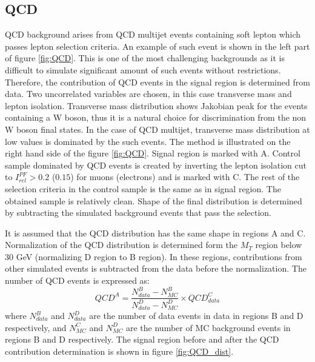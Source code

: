 \subsection{QCD}
\label{sec:QCD}

QCD background arises from QCD multijet events containing soft lepton which passes lepton selection criteria. An example of such event is shown in the left part of figure \ref{fig:QCD}. This is one of the most challenging backgrounds as it is difficult to simulate significant amount of such events without restrictions. Therefore, the contribution of QCD events in the signal region is determined from data. Two uncorrelated variables are chosen, in this case transverse mass and lepton isolation. Transverse mass distribution shows Jakobian peak for the events containing a W boson, thus it is a natural choice for discrimination from the non W boson final states. In the case of QCD multijet, transverse mass distribution at low values is dominated by the such events. The method is illustrated on the right hand side of the figure \ref{fig:QCD}. Signal region is marked with A. Control sample dominated by QCD events is created by inverting the lepton isolation cut to $I_{rel}^{PF}>0.2$ ($0.15$) for muons (electrons) and is marked with C. The rest of the selection criteria in the control sample is the same as in signal region. The obtained sample is relatively clean. Shape of the final distribution is determined by subtracting the simulated background events that pass the selection. 
\par It is assumed that the QCD distribution has the same shape in regions A and C. Normalization of the QCD distribution is determined form the $M_T$ region below 30 GeV (normalizing D region to B region). In these regions, contributions from other simulated events is subtracted from the data before the normalization. The number of QCD events is expressed as:
\begin{equation}
QCD^A=\frac{N^B_{data}-N^B_{MC}}{N^D_{data}-N^D_{MC}}\times QCD^{C}_{data}
\end{equation}       
where $N^B_{data}$ and $N^D_{data}$ are the number of data events in data in regions B and D respectively, and $N^C_{MC}$ and $N^D_{MC}$ are the number of MC background events in regions B and D respectively. The signal region before and after the QCD contribution determination is shown in figure \ref{fig:QCD_dist}.
